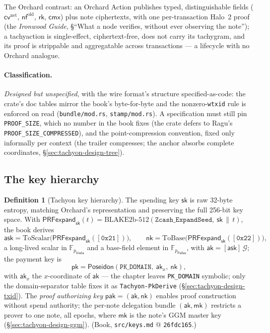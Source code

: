 \documentclass[11pt,a4paper]{article}
\theoremstyle{definition}
\newtheorem{definition}[theorem]{Definition}
\newcommand{\F}{\mathbb{F}}
\newcommand{\nfsym}{\mathsf{nf}}
\newcommand{\cmx}{\mathsf{cmx}}
\newcommand{\cvsym}{\mathsf{cv}}
\newcommand{\rk}{\mathsf{rk}}
\newcommand{\Pallas}{\ensuremath{\mathsf{Pallas}}}
\newcommand{\Vesta}{\ensuremath{\mathsf{Vesta}}}
\newcommand{\ask}{\ensuremath{\mathsf{ask}}}
\newcommand{\aksym}{\ensuremath{\mathsf{ak}}}
\newcommand{\nksym}{\ensuremath{\mathsf{nk}}}
\begin{document}
The Orchard contrast: an Orchard Action publishes typed, distinguishable
fields ($\cvsym^{\mathrm{net}}$, $\nfsym^{\mathrm{old}}$, $\rk$, $\cmx$)
plus note ciphertexts, with one per-transaction Halo~2 proof (the
\emph{Ironwood Guide}, \S``What a node verifies, without ever observing the
note''); a tachyaction is single-effect, ciphertext-free, does not carry
its tachygram, and its proof is strippable and aggregatable across
transactions --- a lifecycle with no Orchard analogue.

\paragraph{Classification.} \emph{Designed but unspecified}, with the wire
format's structure specified-as-code: the crate's doc tables mirror the
book's byte-for-byte and the nonzero-\texttt{wtxid} rule is enforced on
read (\texttt{bundle/mod.rs}, \texttt{stamp/mod.rs}). A specification must
still pin \texttt{PROOF\_SIZE}, which no number in the book fixes (the
crate defers to Ragu's \texttt{PROOF\_SIZE\_COMPRESSED}), and the
point-compression convention, fixed only informally per context (the
trailer compresses; the anchor absorbs complete coordinates,
\S\ref{sec:tachyon-design-tree}).

\subsection{The key hierarchy}\label{sec:tachyon-design-keys}

\begin{definition}[Tachyon key hierarchy]\label{def:tachyon-design-keys}
The spending key $\mathsf{sk}$ is raw 32-byte entropy, matching Orchard's
representation and preserving the full 256-bit key space. With
$\mathsf{PRFexpand}_{\mathsf{sk}}(t) =
\text{BLAKE2b-512}(\texttt{Zcash\_ExpandSeed},\ \mathsf{sk} \,\|\, t)$,
the book derives
\[
\ask = \mathrm{ToScalar}\bigl(\mathsf{PRFexpand}_{\mathsf{sk}}
  ([\mathtt{0x21}])\bigr), \qquad
\nksym = \mathrm{ToBase}\bigl(\mathsf{PRFexpand}_{\mathsf{sk}}
  ([\mathtt{0x22}])\bigr),
\]
a long-lived scalar in $\F_{p_{\Vesta}}$ and a base-field element in
$\F_{p_{\Pallas}}$, with $\aksym = [\ask]\,\mathcal{G}$; the payment key is
\[
\mathsf{pk} = \mathsf{Poseidon}(\texttt{PK\_DOMAIN},\ \aksym_x,\ \nksym),
\]
with $\aksym_x$ the $x$-coordinate of $\aksym$ --- the chapter leaves
\texttt{PK\_DOMAIN} symbolic; only the domain-separator table fixes it as
\texttt{Tachyon-PkDerive} (\S\ref{sec:tachyon-design-txid}). The
\emph{proof authorizing key} $\mathsf{pak} = (\aksym, \nksym)$ enables
proof construction without spend authority; the per-note delegation bundle
$(\aksym, \mathsf{mk})$ restricts a prover to one note, all epochs, where
$\mathsf{mk}$ is the note's GGM master key
(\S\ref{sec:tachyon-design-ggm}). (Book, \texttt{src/keys.md} @
\texttt{26fdc165}.)
\end{definition}
\end{document}
